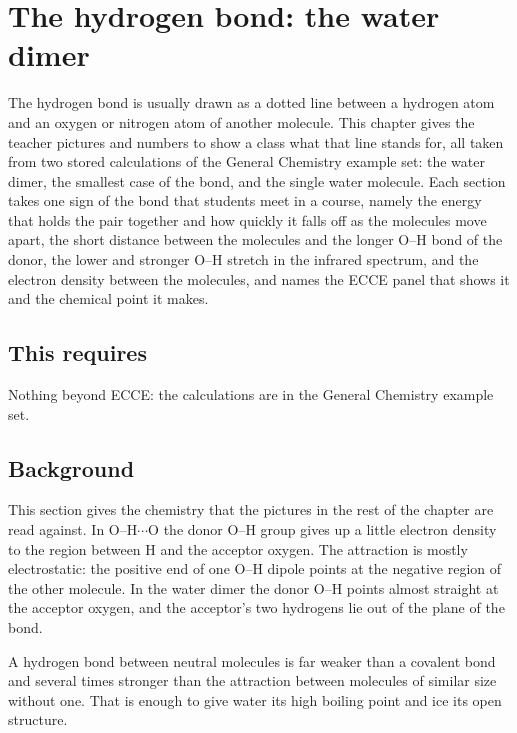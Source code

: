 \chapter{The hydrogen bond: the water dimer}
\label{sec:hydrogen-bond}


The hydrogen bond is usually drawn as a dotted line between a hydrogen atom and an oxygen or nitrogen atom of another molecule. This chapter gives the teacher pictures and numbers to show a class what that line stands for, all taken from two stored calculations of the General Chemistry example set: the water dimer, the smallest case of the bond, and the single water molecule. Each section takes one sign of the bond that students meet in a course, namely the energy that holds the pair together and how quickly it falls off as the molecules move apart, the short distance between the molecules and the longer O--H bond of the donor, the lower and stronger O--H stretch in the infrared spectrum, and the electron density between the molecules, and names the ECCE panel that shows it and the chemical point it makes.

\section*{This requires}
Nothing beyond ECCE: the calculations are in the General Chemistry example set.

\section{Background}
This section gives the chemistry that the pictures in the rest of the chapter are read against. In O--H$\cdots$O the donor O--H group gives up a little electron density to the region between H and the acceptor oxygen. The attraction is mostly electrostatic: the positive end of one O--H dipole points at the negative region of the other molecule. In the water dimer the donor O--H points almost straight at the acceptor oxygen, and the acceptor's two hydrogens lie out of the plane of the bond.

A hydrogen bond between neutral molecules is far weaker than a covalent bond and several times stronger than the attraction between molecules of similar size without one. That is enough to give water its high boiling point and ice its open structure.

